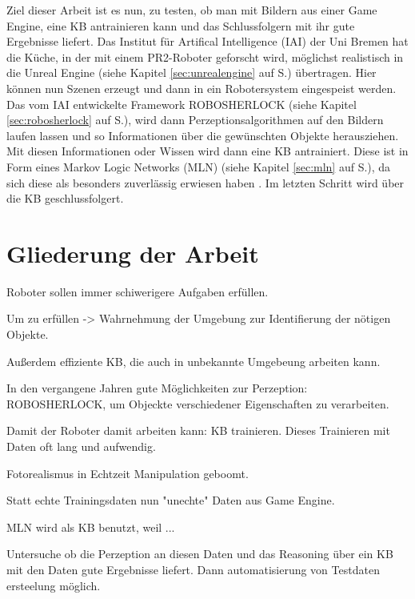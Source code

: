 Ziel dieser Arbeit ist es nun, zu testen, ob man mit Bildern aus einer Game Engine, eine KB antrainieren kann und das Schlussfolgern mit ihr gute Ergebnisse liefert. Das Institut für Artifical Intelligence (IAI) der Uni Bremen hat die Küche, in der mit einem PR2-Roboter geforscht wird, möglichst realistisch in die Unreal Engine (siehe Kapitel \ref{sec:unrealengine} auf S.\pageref{sec:unrealengine}) übertragen. Hier können nun Szenen erzeugt und dann in ein Robotersystem eingespeist werden. Das vom IAI entwickelte Framework ROBOSHERLOCK (siehe Kapitel \ref{sec:robosherlock} auf S.\pageref{sec:robosherlock}), wird dann Perzeptionsalgorithmen auf den Bildern laufen lassen und so Informationen über die gewünschten Objekte herausziehen. Mit diesen Informationen oder Wissen wird dann eine KB antrainiert. Diese ist in Form eines Markov Logic Networks (MLN) (siehe Kapitel \ref{sec:mln} auf S.\pageref{sec:mln}), da sich diese als besonders zuverlässig erwiesen haben . Im letzten Schritt wird über die KB geschlussfolgert.    


\section{Gliederung der Arbeit}
\label{sec:gliederung}



Roboter sollen immer schiwerigere Aufgaben erfüllen.

Um zu erfüllen -> Wahrnehmung der Umgebung zur Identifierung der nötigen Objekte.

Außerdem effiziente KB, die auch in unbekannte Umgebeung arbeiten kann. \par

In den vergangene Jahren gute Möglichkeiten zur Perzeption: ROBOSHERLOCK, um Objeckte verschiedener Eigenschaften zu verarbeiten.

Damit der Roboter damit arbeiten kann: KB trainieren.
Dieses Trainieren mit Daten oft lang und aufwendig.

Fotorealismus in Echtzeit Manipulation geboomt.

Statt echte Trainingsdaten nun "unechte" Daten aus Game Engine.

MLN wird als KB benutzt, weil ...

Untersuche ob die Perzeption an diesen Daten und das Reasoning über ein KB mit den Daten gute Ergebnisse liefert. Dann automatisierung von Testdaten ersteelung möglich. 
   

